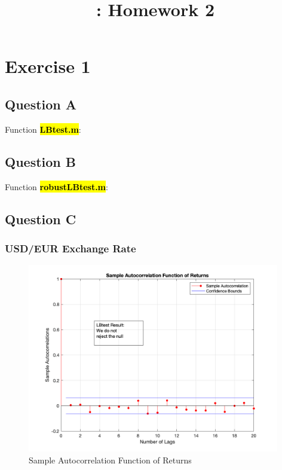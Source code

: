 \documentclass{report}
\title {\LectureTitle : Homework 2}
\begin{document}
	
\maketitle

\section*{Exercise 1}

\subsection*{Question A}
Function \hl{\textbf{LBtest.m}}:




\subsection*{Question B}
Function \hl{\textbf{robustLBtest.m}}:




\subsection*{Question C}
\subsubsection*{USD/EUR Exchange Rate}
\begin{figure}[H]
	\centering
	\includegraphics[width = 11cm]{fig/1c11}
	\caption{Sample Autocorrelation Function of Returns} 
\end{figure}
\end{document}
